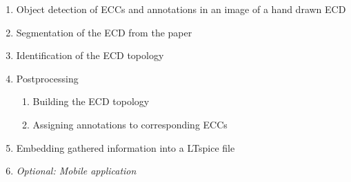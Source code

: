 \documentclass{article} %
\begin{document}
\begin{enumerate}
\item Object detection of ECCs and annotations in an image of a hand drawn ECD
\item Segmentation of the ECD from the paper
\item Identification of the ECD topology
\item Postprocessing
        \begin{enumerate}
        \item Building the ECD topology
        \item Assigning annotations to corresponding ECCs
        \end{enumerate}
\item Embedding gathered information into a LTspice file
\item \textit{Optional: Mobile application}
\end{enumerate}



\end{document}
